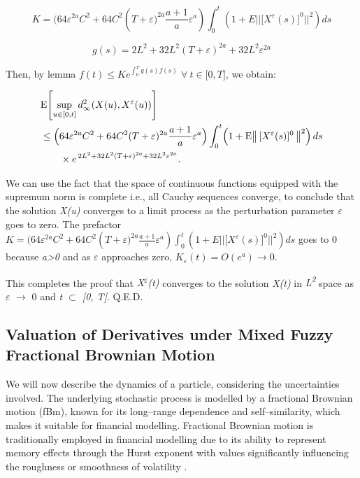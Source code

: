 \documentclass[12pt,a4paper]{report}
\numberwithin{equation}{section}
\begin{document}
\[K = (64\varepsilon^{2a}C^{2} + {64C}^{2}({T + \varepsilon)}^{2a}\frac{a + 1}{a}\varepsilon^{a})\int_{0}^{t}{(1 + E||\lbrack X^{\varepsilon}(s)\rbrack^{0}||^{2})ds}\]

\[g(s) = 2L^{2} + 32L^{2}(T + \varepsilon)^{2a} + 32L^{2}\varepsilon^{2a}\]

Then, by lemma
\(f(t) \leq Ke^{\int_{0}^{T}{g(s)f(s)\ \ }}\forall\ t \in \lbrack 0,T\rbrack\),
we obtain:

\[
\begin{aligned}
&\mathrm{E}\!\left[\sup_{u\in[0,t]} d_{\infty}^{2}\!\left(X(u),X^{\varepsilon}(u)\right)\right] \\
&\le \Bigl(64\varepsilon^{2a}C^{2} + 64C^{2}(T+\varepsilon)^{2a}\frac{a+1}{a}\varepsilon^{a}\Bigr)
\int_{0}^{t}\Bigl(1+\mathrm{E}\bigl\|\,[X^{\varepsilon}(s)]^{0}\,\bigr\|^{2}\Bigr)\,ds \\
&\qquad \times e^{\,2L^{2} + 32L^{2}(T+\varepsilon)^{2a} + 32L^{2}\varepsilon^{2a}} .
\end{aligned}
\]

We can use the fact that the space of continuous functions equipped with
the supremum norm is complete i.e., all Cauchy sequences converge, to
conclude that the solution \emph{X(u)} converges to a limit process as
the perturbation parameter \emph{$\varepsilon$} goes to zero. The prefactor
\(K = (64\varepsilon^{2a}C^{2} + {64C}^{2}({T + \varepsilon)}^{2a}\frac{a + 1}{a}\varepsilon^{a})\int_{0}^{t}{(1 + E||\lbrack X^{\varepsilon}(s)\rbrack^{0}||^{2})ds}\)
goes to 0 because \emph{a\textgreater0} and as \emph{$\varepsilon$} approaches zero,
\(K_{\varepsilon}(t) = O(e^{a}) \rightarrow 0.\)

This completes the
proof that \emph{X\textsuperscript{$\varepsilon$}(t)} converges to the solution
\emph{X(t)} in \emph{L\textsuperscript{2}} space as \emph{$\varepsilon$} $\rightarrow$ 0 and
\emph{t $\subset$ {[}0, T{]}}. Q.E.D.

\hypertarget{applications}{%
\subsection{\texorpdfstring{Valuation of Derivatives under Mixed Fuzzy Fractional Brownian Motion
}{Valuation of Derivatives under Mixed Fuzzy Fractional Brownian Motion }}\label{Valuation of Derivatives under Mixed Fuzzy Fractional Brownian Motion}}

We will now describe the dynamics of a particle, considering the
uncertainties involved. The underlying stochastic process is modelled by
a fractional Brownian motion (fBm), known for its long--range dependence
and self--similarity, which makes it suitable for financial modelling.
Fractional Brownian motion is traditionally employed in financial
modelling due to its ability to represent memory effects through the
Hurst exponent with values significantly influencing the roughness or
smoothness of volatility \cite{thao2006approximate_80}.
\end{document}
